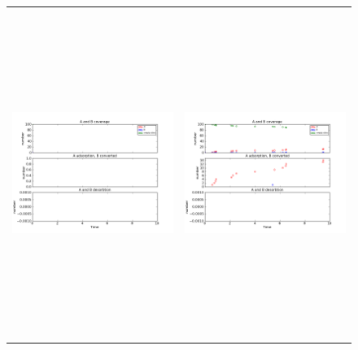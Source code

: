\documentclass[11pt]{article}
\begin{document}
\setlength{\unitlength}{1in}
\begin{figure}[h!]
\begin{tabular}{cc}
\includegraphics[width=3.5in, height=4.2in]{./coadsorb_irreversible/AtoBirreversible10x10_101_allsameklarge_A5_EA10E3_3.png} &
\includegraphics[width=3.5in, height=4.2in]{./coadsorb_irreversible/AtoBirreversible10x10_201_allsameklarge_A5_EA10E3_3.png} \\

\end{tabular}
\end{figure}
\end{document}
